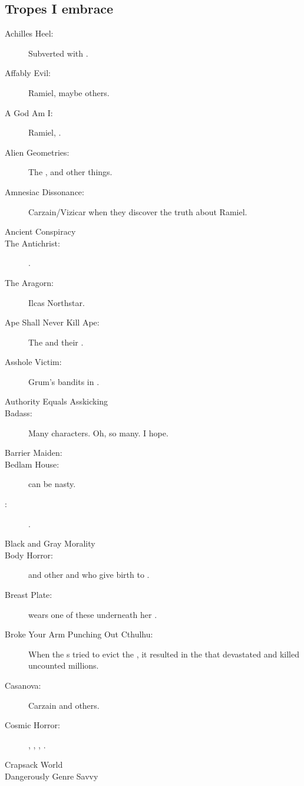\begin{flushleft}
\section{Tropes I embrace}
\begin{description}
  \item[Achilles Heel:] Subverted with \Ishnaruchaefir. 
  \item[Affably Evil:] Ramiel, maybe others.
  \item[A God Am I:] Ramiel, \HriistD. 
  \item[Alien Geometries:] 
    The , and other things. 
  \item[Amnesiac Dissonance:] 
    Carzain/Vizicar when they discover the truth about Ramiel.
  \item[Ancient Conspiracy] 
  \item[The Antichrist:]
    \Thanatzil. 
  \item[The Aragorn:] Ilcas Northstar.
  \item[Ape Shall Never Kill Ape:] 
    The \dragons{} and their . 
  \item[Asshole Victim:] 
    Grum's bandits in \TwilightAngelRememberEmph. 
  \item[Authority Equals Asskicking]  
  \item[Badass:] 
    Many characters. 
    Oh, so many. 
    I hope. 
  \item[Barrier Maiden:] \Triestessakhin 
  \item[Bedlam House:]  can be nasty. 
  \item[\Bishounen:] \Teshrial. 
  \item[Black and Gray Morality]
  \item[Body Horror:] 
    \Ilu{} and other \nephilim{} and \humans{} who give birth to \resphain.
  \item[Breast Plate:] 
     wears one of these underneath her .
  \item[Broke Your Arm Punching Out Cthulhu:]
    When the \Miithian s tried to evict the \banes, it resulted in the \SecondShrouding{} that devastated \Miith{} and killed uncounted millions. 
  \item[Casanova:] Carzain and others. 
  \item[Cosmic Horror:] 
    , , , \banelords.
  \item[Crapsack World]
  \item[Dangerously Genre Savvy] 

\end{description}
\end{flushleft}
